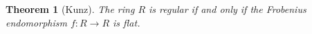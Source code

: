 \documentclass[leqno]{article}
\newtheorem{theorem}{Theorem}[section]
\theoremstyle{definition}
\begin{document}
\begin{theorem}[Kunz] The ring  $R$ is regular if and only if the Frobenius endomorphism $f:R\to R$ is flat.
\end{theorem}



\nocite{*}


\end{document}
